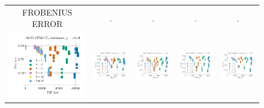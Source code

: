 \begin{figure}
\begin{tabular}{@{\hskip -0.0in}c@{\hskip -0.0in}c@{\hskip -0.0in}c@{\hskip -0.0in}c@{\hskip -0.0in}c@{\hskip -0.0in}}
		
		FROBENIUS ERROR & . & . & . & .\\
		\includegraphics[width=.2\linewidth]{figures/glove-wiki400k-am_sentiment_mr_test-acc_vs_gram-large-dim-frob-error_linx.pdf} &
		\includegraphics[width=.2\linewidth]{figures/glove-wiki400k-am_sentiment_subj_test-acc_vs_gram-large-dim-frob-error_linx.pdf} &
		\includegraphics[width=.2\linewidth]{figures/glove-wiki400k-am_sentiment_cr_test-acc_vs_gram-large-dim-frob-error_linx.pdf} &
		\includegraphics[width=.2\linewidth]{figures/glove-wiki400k-am_sentiment_sst_test-acc_vs_gram-large-dim-frob-error_linx.pdf} &
		\includegraphics[width=.2\linewidth]{figures/glove-wiki400k-am_sentiment_mpqa_test-acc_vs_gram-large-dim-frob-error_linx.pdf} \\
		

\end{tabular}
\end{figure}
